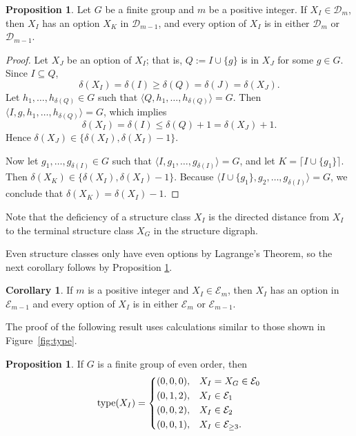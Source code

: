 \documentclass[12pt]{amsart}
\theoremstyle{definition}
\newtheorem{corollary}[equation]{Corollary}
\newtheorem{proposition}[equation]{Proposition}
\theoremstyle{definition}
\numberwithin{equation}{section}
\begin{document}
\begin{proposition}\label{prop:setoptions}
Let $G$ be a finite group and $m$ be a positive integer. If $X_I \in \mathcal{D}_m$, 
then $X_I$ has an option $X_K$ in $\mathcal{D}_{m-1}$, and every option of $X_I$ is in either $\mathcal{D}_m$ or $\mathcal{D}_{m-1}$.
\end{proposition}
\begin{proof}
Let $X_J$ be an option of $X_I$; 
that is, $Q:=I\cup\{g\}$ is in $X_J$ for some $g\in G$. Since $I\subseteq Q$, \[\delta(X_I)=\delta(I)\ge\delta(Q)=\delta(J)=\delta(X_J).\]  Let $h_1,\ldots,h_{\delta(Q)}\in G$ such that $\langle Q,h_1,\ldots,h_{\delta(Q)}\rangle=G$.  Then $\langle I,g,h_1,\ldots,h_{\delta(Q)}\rangle=G$, which implies \[\delta(X_I)=\delta(I)\le\delta(Q)+1=\delta(X_J)+1.\]  Hence ${\delta}(X_J) \in \{{\delta}(X_I),{\delta}(X_I)-1\}$.

Now let $g_1,\ldots,g_{\delta(I)}\in G$ such that $\langle I,g_1,\ldots,g_{\delta(I)}\rangle=G$, and let $K=\lceil I \cup \{g_1\} \rceil$. Then ${\delta}(X_K) \in \{{\delta}(X_I),{\delta}(X_I)-1\}$.  Because $\langle I \cup \{g_1\},g_2,\ldots,g_{\delta(I)}\rangle = G$, we conclude that ${\delta}(X_K)={\delta}(X_I)-1$.
\end{proof}

Note that the deficiency of a structure class $X_I$ is the directed distance from $X_I$ to the terminal structure class $X_G$ in the structure digraph.

Even structure classes only have even options by Lagrange's Theorem, so the next corollary follows by Proposition \ref{prop:setoptions}.

\begin{corollary}\label{cor:Esetoptions}
If $m$ is a positive integer and $X_I \in \mathcal{E}_m$, then $X_I$ has an option in $\mathcal{E}_{m-1}$ and every option of $X_I$ is in either $\mathcal{E}_m$ or $\mathcal{E}_{m-1}$.
\end{corollary}

The proof of the following result uses calculations similar to those shown in Figure~\ref{fig:type}.

\begin{proposition}\label{prop:GENeventypes}
If $G$ is a finite group of even order, then 
\[
	   {\operatorname{type}}(X_I) = 
	     \begin{dcases}
	       (0,0,0), & X_I=X_G \in \mathcal{E}_0\\
	       (0,1,2), & X_I \in \mathcal{E}_1\\
	       (0,0,2), & X_I \in \mathcal{E}_2\\
	       (0,0,1), & X_I \in \mathcal{E}_{\geq 3}.
	     \end{dcases}
\]
\end{proposition}
\end{document}
